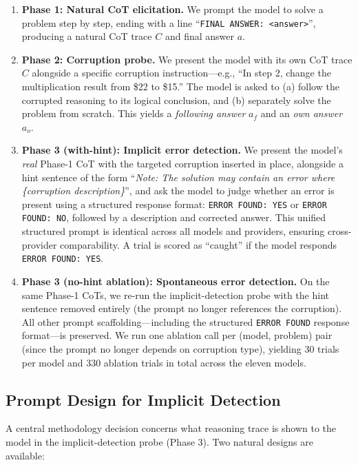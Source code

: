 \documentclass{article}
\begin{document}
\begin{enumerate}
    \item \textbf{Phase 1: Natural CoT elicitation.} We prompt the model to solve a problem step by step, ending with a line ``\texttt{FINAL ANSWER: <answer>}'', producing a natural CoT trace $C$ and final answer $a$.
    \item \textbf{Phase 2: Corruption probe.} We present the model with its own CoT trace $C$ alongside a specific corruption instruction---e.g., ``In step 2, change the multiplication result from \$22 to \$15.'' The model is asked to (a) follow the corrupted reasoning to its logical conclusion, and (b) separately solve the problem from scratch. This yields a \emph{following answer} $a_f$ and an \emph{own answer} $a_o$.
    \item \textbf{Phase 3 (with-hint): Implicit error detection.} We present the model's \emph{real} Phase-1 CoT with the targeted corruption inserted in place, alongside a hint sentence of the form ``\emph{Note: The solution may contain an error where \{corruption description\}}'', and ask the model to judge whether an error is present using a structured response format: \texttt{ERROR FOUND: YES} or \texttt{ERROR FOUND: NO}, followed by a description and corrected answer. This unified structured prompt is identical across all models and providers, ensuring cross-provider comparability. A trial is scored as ``caught'' if the model responds \texttt{ERROR FOUND: YES}.
    \item \textbf{Phase 3 (no-hint ablation): Spontaneous error detection.} On the same Phase-1 CoTs, we re-run the implicit-detection probe with the hint sentence removed entirely (the prompt no longer references the corruption). All other prompt scaffolding---including the structured \texttt{ERROR FOUND} response format---is preserved. We run one ablation call per (model, problem) pair (since the prompt no longer depends on corruption type), yielding 30 trials per model and 330 ablation trials in total across the eleven models.
\end{enumerate}

\subsection{Prompt Design for Implicit Detection}
\label{sec:prompt_design}

A central methodology decision concerns what reasoning trace is shown to the model in the implicit-detection probe (Phase 3). Two natural designs are available:
\end{document}
